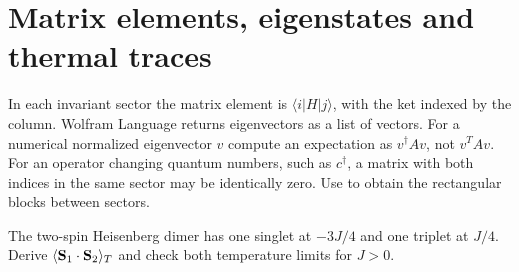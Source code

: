 \section{Matrix elements, eigenstates and thermal traces}
In each invariant sector the matrix element is $\langle i|H|j\rangle$,
with the ket indexed by the column. Wolfram Language
 returns eigenvectors as a list of vectors. For a
numerical normalized eigenvector $v$ compute an expectation as
$v^\dagger A v$, not $v^T A v$. For an operator changing quantum
numbers, such as $c^\dagger$, a matrix with both indices in the same
sector may be identically zero. Use  to obtain
the rectangular blocks between sectors.
\begin{exercise}\label{ex:multiplet}
The two-spin Heisenberg dimer has one singlet at $-3J/4$ and one
triplet at $J/4$. Derive $\langle\mathbf{S}_1\cdot\mathbf{S}_2\rangle_T$ and
check both temperature limits for $J>0$.
\end{exercise}
